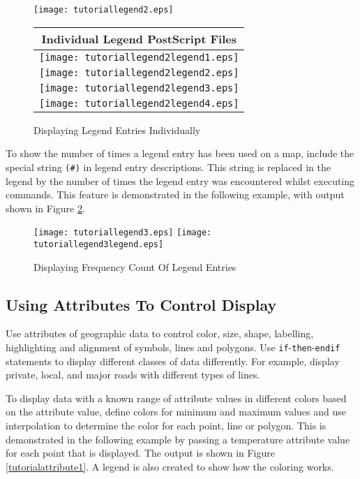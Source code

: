 \begin{figure}[htb]
\texttt{[image: tutoriallegend2.eps]}
\vspace{10pt}

\begin{tabular}{|c|}
\hline
Individual Legend PostScript Files \\
\hline
\texttt{[image: tutoriallegend2legend1.eps]} \\
\hline
\texttt{[image: tutoriallegend2legend2.eps]} \\
\hline
\texttt{[image: tutoriallegend2legend3.eps]} \\
\hline
\texttt{[image: tutoriallegend2legend4.eps]} \\
\hline
\end{tabular}

\caption{Displaying Legend Entries Individually}
\label{tutoriallegend2}
\end{figure}

To show the number of times a legend entry has been used on
a map, include the special string \texttt{(\#)} in legend entry descriptions.
This string is replaced in the legend by the number of times the legend entry
was encountered whilst executing commands.
This feature is demonstrated in the following example,
with output shown in 
Figure \ref{tutoriallegend3}.



\begin{figure}[htb]
\texttt{[image: tutoriallegend3.eps]}
\texttt{[image: tutoriallegend3legend.eps]}
\caption{Displaying Frequency Count Of Legend Entries}
\label{tutoriallegend3}
\end{figure}

\subsection{Using Attributes To Control Display}

Use attributes of geographic data to control
color, size, shape, labelling, highlighting and alignment of symbols, lines
and polygons.
Use \texttt{if}-\texttt{then}-\texttt{endif}
statements to display different classes of data
differently.  For example, display private, local, and major roads
with different types of lines.

To display data with a known range of attribute values in different
colors based on the attribute value, define colors for minimum and
maximum values and use interpolation to determine the color for
each point, line or polygon.  This is demonstrated in the following
example by passing a temperature attribute value for each point
that is displayed.  The output is shown in Figure \ref{tutorialattribute1}.
A legend is also created to show how the coloring works.

